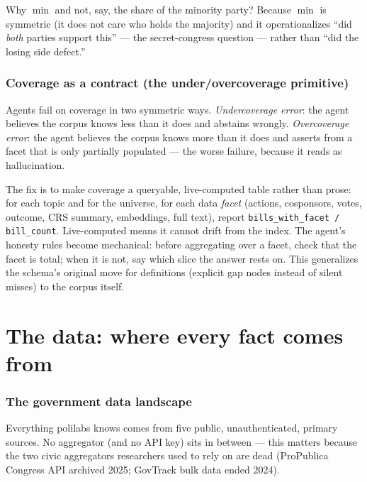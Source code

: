 \documentclass[11pt]{article}
\newcommand{\code}[1]{\texttt{#1}}
\begin{document}
Why $\min$ and not, say, the share of the minority party? Because $\min$ is
symmetric (it does not care who holds the majority) and it operationalizes
``did \emph{both} parties support this'' --- the secret-congress question ---
rather than ``did the losing side defect.''

\section{Coverage as a contract (the under/overcoverage primitive)}
\label{sec:coverage}

Agents fail on coverage in two symmetric ways. \emph{Undercoverage error}:
the agent believes the corpus knows less than it does and abstains wrongly.
\emph{Overcoverage error}: the agent believes the corpus knows more than it
does and asserts from a facet that is only partially populated --- the worse
failure, because it reads as hallucination.

The fix is to make coverage a queryable, live-computed table rather than
prose: for each topic and for the universe, for each data \emph{facet}
(actions, cosponsors, votes, outcome, CRS summary, embeddings, full text),
report \code{bills\_with\_facet / bill\_count}. Live-computed means it cannot
drift from the index. The agent's honesty rules become mechanical: before
aggregating over a facet, check that the facet is total; when it is not, say
which slice the answer rests on. This generalizes the schema's original move
for definitions (explicit gap nodes instead of silent misses) to the corpus
itself.

\part{The data: where every fact comes from}

\section{The government data landscape}
\label{sec:sources}

Everything polilabs knows comes from five public, unauthenticated, primary
sources. No aggregator (and no API key) sits in between --- this matters
because the two civic aggregators researchers used to rely on are dead
(ProPublica Congress API archived 2025; GovTrack bulk data ended 2024).
\end{document}
